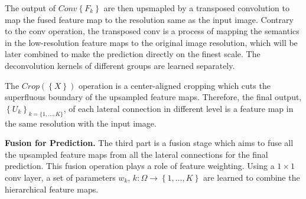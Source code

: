 The output of ${Conv\left\{F_{k}\right\}}$ are then upsmapled by a transposed convolution to map the fused feature map to the resolution same as the input image.
Contrary to the conv operation, the transposed conv is a process of mapping the semantics in the low-resolution feature maps to the original image resolution, which will be later combined to make the prediction directly on the finest scale.
The deconvolution kernels of different groups are learned separately. 



%
The ${Crop(\left\{X \right\})}$ operation is a center-aligned cropping which cuts the superfluous boundary of the upsampled feature maps. 
Therefore, the final output, $\left\{U_k\right\}_{k=\{1,\ldots,K\}}$, of each lateral connection in different level is a feature map in the same resolution with the input image.


\noindent\textbf{Fusion for Prediction.} The third part is a fusion stage which aims to fuse all the upsampled feature maps from all the lateral connections for the final prediction.
%
This fusion operation plays a role of feature weighting.
Using a ${1\times1}$ conv layer, a set of parameters ${w_k}$, ${k:\Omega \to\left\{1,\ldots,K\right\}}$ are learned to combine the hierarchical feature maps.



